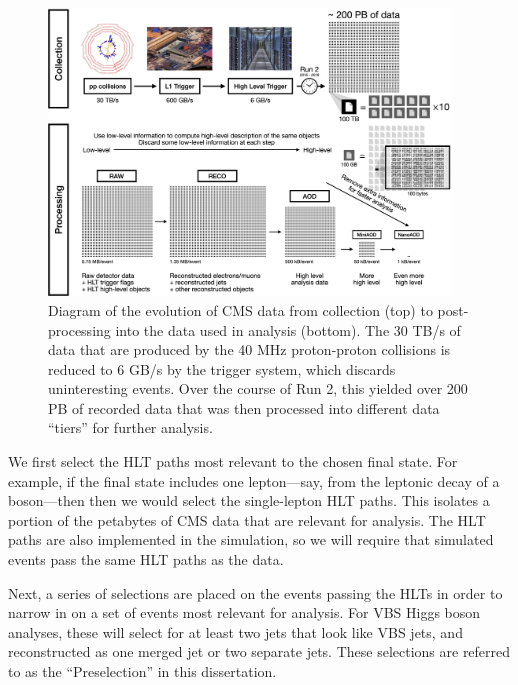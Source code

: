 \begin{figure}[htb]
    \centering
    \includegraphics[width=0.95\textwidth]{fig/cms/pp_to_nano.png}
    \caption[Diagram of the evolution of CMS data from collection to post-processing into the data used in analysis]{
        Diagram of the evolution of CMS data from collection (top) to post-processing into the data used in analysis (bottom). 
        The 30 TB/s of data that are produced by the 40 MHz proton-proton collisions is reduced to 6 GB/s by the trigger system, which discards uninteresting events. 
        Over the course of Run 2, this yielded over 200 PB of recorded data that was then processed into different data ``tiers'' for further analysis. 
    }
    \label{fig:pp_to_nano}
\end{figure}

We first select the HLT paths most relevant to the chosen final state. 
For example, if the final state includes one lepton---say, from the leptonic decay of a \PW boson---then then we would select the single-lepton HLT paths. 
This isolates a portion of the petabytes of CMS data that are relevant for analysis. 
The HLT paths are also implemented in the simulation, so we will require that simulated events pass the same HLT paths as the data. 

Next, a series of selections are placed on the events passing the HLTs in order to narrow in on a set of events most relevant for analysis. 
For VBS Higgs boson analyses, these will select for at least two jets that look like VBS jets, and \Htobb reconstructed as one merged jet or two separate jets. 
These selections are referred to as the ``Preselection'' in this dissertation. 

